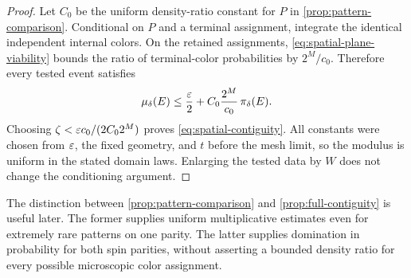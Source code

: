\begin{proof}
Let $C_0$ be the uniform density-ratio constant for $P$ in
\cref{prop:pattern-comparison}. Conditional on $P$ and a terminal
assignment, integrate the identical independent internal colors.
On the retained assignments,
\eqref{eq:spatial-plane-viability} bounds the ratio of terminal-color
probabilities by $2^M/c_0$. Therefore every tested event satisfies
\begin{equation}\label{eq:spatial-contiguity-modulus}
       \mu_\delta(E)
       \le \frac{\varepsilon}{2}
                + C_0\frac{2^M}{c_0}\,\pi_\delta(E).
\end{equation}
Choosing $\zeta<\varepsilon c_0/(2C_0 2^M)$ proves
\eqref{eq:spatial-contiguity}. All constants were chosen from
$\varepsilon$, the fixed geometry, and $t$ before the mesh limit, so the
modulus is uniform in the stated domain laws. Enlarging the tested
data by $W$ does not change the conditioning argument.
\end{proof}

The distinction between \cref{prop:pattern-comparison} and
\cref{prop:full-contiguity} is useful later. The former supplies
uniform multiplicative estimates even for extremely rare
patterns on one parity. The latter supplies domination in probability
for both spin parities, without asserting a bounded density ratio
for every possible microscopic color assignment.
